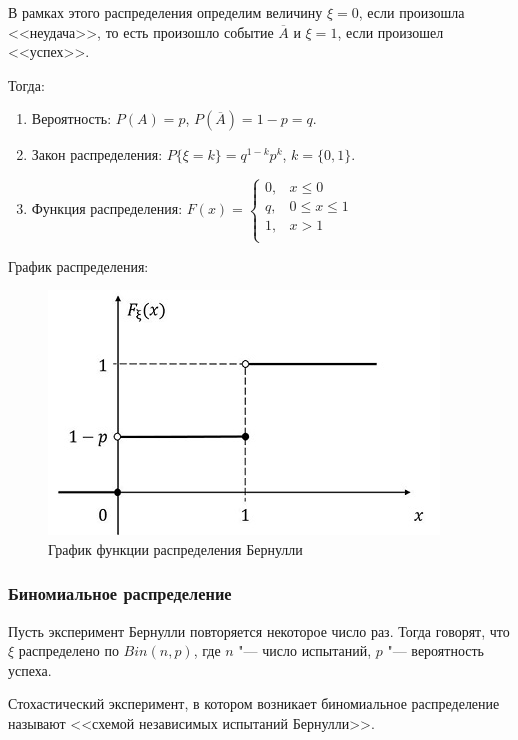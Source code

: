 \begin{theorem}
    В рамках этого распределения определим
    величину $\xi = 0$, если произошла <<неудача>>, то
    есть произошло событие $\overline{A}$ и $\xi = 1$,
    если произошел <<успех>>.
    
    Тогда:
    \begin{enumerate}
        \item Вероятность: $P(A) = p$,
        $P(\overline{A}) = 1 - p = q$.
        \item Закон распределения: $P\{ \xi = k\} = q^{1 - k}p^k$, $k = \{0, 1\}$.
        \item Функция распределения: $F(x) = 
        \begin{cases}
            0, & x \leq 0 \\
            q, & 0 \le x \leq 1 \\
            1, & x > 1 \\
        \end{cases}$
    \end{enumerate}    
\end{theorem}

График распределения:
\begin{figure}[H]
    \centering
    \includegraphics[scale=0.5]{images/bern.jpeg}
    \caption{График функции распределения Бернулли}
\end{figure}

\subsubsection{Биномиальное распределение}
Пусть эксперимент Бернулли повторяется
некоторое число раз. Тогда говорят, что
$\xi$ распределено по $Bin(n, p)$, где
$n$ "--- число испытаний, $p$ "--- вероятность
успеха.

Стохастический эксперимент, в котором возникает
биномиальное распределение называют
<<схемой независимых испытаний Бернулли>>.

